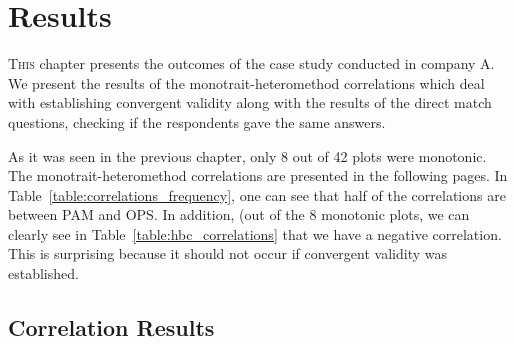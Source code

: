 \chapter{Results}
\label{ch:results}


\lettrine[lines=4, loversize=-0.1, lraise=0.1]{T}{his} chapter presents the outcomes of the case study conducted in company A. We present the results of the monotrait-heteromethod correlations which deal with establishing convergent validity along with the results of the direct match questions, checking if the respondents gave the same answers.

As it was seen in the previous chapter, only 8 out of 42 plots were monotonic. The monotrait-heteromethod correlations are presented in the following pages. In Table~\ref{table:correlations_frequency}, one can see that half of the correlations are between \ac{PAM} and \ac{OPS}. In addition, (out of the 8 monotonic plots, we can clearly see in Table~\ref{table:hbc_correlations} that we have a negative correlation. This is surprising because it should not occur if convergent validity was established.  %
\section{Correlation Results}

